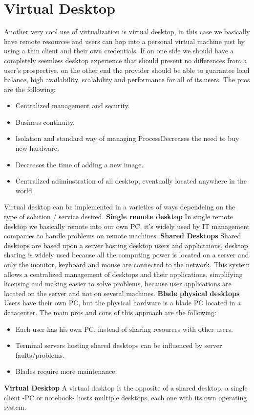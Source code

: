 \section{Virtual Desktop}
Another very cool use of virtualization is virtual desktop, in this case we basically have remote resources and users can hop into a personal virtual machine just by using a thin client and their own credentials. If on one side we should have a completely seemless desktop experience that should present no differences from a user's prospective, on the other end the provider should be able to guarantee load balance, high availability, scalability and performance for all of its users. \n
The pros are the following:
\begin{itemize}
    \item Centralized management and security.
    \item Business continuity.
    \item Isolation and standard way of managing ProcessDecreases the need to buy new hardware.
    \item Decreases the time of adding a new image.
    \item Centralized adiminstration of all desktop, eventually located anywhere in the world.
\end{itemize}
Virtual desktop can be implemented in a varieties of ways dependeing on the type of solution / service desired. \n
\textbf{Single remote desktop} \n
In single remote desktop we basically remote into our own PC, it's widely used by IT management companies to handle problems on remote machines. \n
\miniSpace
\textbf{Shared Desktops} \n
Shared desktops are based upon a server hosting desktop users and applictaions, desktop sharing is widely used because all the computing power is located on a server and only the monitor, keyboard and mouse are connected to the network. \n
This system allows a centralized management of desktops and their applications, simplifying licensing and making easier to solve problems, because user applications are located on the server and not on several machines. \n
\miniSpace
\textbf{Blade physical desktops}
Users have their own PC, but the physical hardware is a blade PC located in a datacenter. The main pros and cons of this approach are the following:
\begin{itemize}
    \item Each user has his own PC, instead of sharing resources with other users.
    \item Terminal servers hosting shared desktops can be influenced by server faults/problems.
    \item Blades require more maintenance.
\end{itemize}
\textbf{Virtual Desktop} \n
A virtual desktop is the opposite of a shared desktop, a single client -PC or notebook- hosts multiple desktops, each one with its own operating system.
